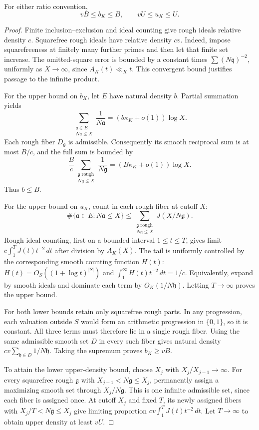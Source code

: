 \begin{lemma}\label{lem:BU}
For either ratio convention,
\[
                  vB\le b_K\le B,\qquad vU\le u_K\le U.
\]
\end{lemma}
\begin{proof}
Finite inclusion--exclusion and ideal counting give rough ideals
relative density $c$.  Squarefree rough ideals have relative density
$cv$.  Indeed, impose squarefreeness at finitely many further primes
and then let that finite set increase.  The omitted-square error is
bounded by a constant times $\sum(N\mathfrak q)^{-2}$, uniformly as
$X\to\infty$, since $A_K(t)\ll_K t$.  This convergent bound justifies
passage to the infinite product.

For the upper bound on $b_K$, let $E$ have natural density $b$.  Partial
summation yields
\[
 \sum_{\substack{\mathfrak a\in E\\N\mathfrak a\le X}}
       \frac1{N\mathfrak a}
   =(b\kappa_K+o(1))\log X.
\]
Each rough fiber $D_{\mathfrak g}$ is admissible.  Consequently its
smooth reciprocal sum is at most $B/c$, and the full sum is bounded by
\[
 \frac Bc\sum_{\substack{\mathfrak g\text{ rough}\\N\mathfrak g\le X}}
          \frac1{N\mathfrak g}
   =(B\kappa_K+o(1))\log X.
\]
Thus $b\le B$.

For the upper bound on $u_K$, count in each rough fiber at cutoff $X$:
\[
 \#\{\mathfrak a\in E:N\mathfrak a\le X\}
 \le \sum_{\substack{\mathfrak g\text{ rough}\\N\mathfrak g\le X}}
                  J(X/N\mathfrak g).
\]
Rough ideal counting, first on a bounded interval $1\le t\le T$, gives
limit $c\int_1^T J(t)t^{-2}\,dt$ after division by $A_K(X)$.
The tail is uniformly controlled by the corresponding smooth counting
function $H(t)$: $H(t)=O_S((1+\log t)^{|S|})$ and
$\int_1^\infty H(t)t^{-2}\,dt=1/c$.  Equivalently, expand by smooth
ideals and dominate each term by $O_K(1/N\mathfrak h)$.
Letting $T\to\infty$ proves the upper bound.

For both lower bounds retain only squarefree rough parts.  In any
progression, each valuation outside $S$ would form an arithmetic
progression in $\{0,1\}$, so it is constant.  All three terms must
therefore lie in a single rough fiber.  Using the same admissible
smooth set $D$ in every such fiber gives natural density
$cv\sum_{\mathfrak h\in D}1/N\mathfrak h$.  Taking the supremum
proves $b_K\ge vB$.

To attain the lower upper-density bound, choose $X_j$ with
$X_j/X_{j-1}\to\infty$.  For every squarefree rough $\mathfrak g$
with $X_{j-1}<N\mathfrak g\le X_j$, permanently assign a maximizing
smooth set through $X_j/N\mathfrak g$.  This is one infinite admissible
set, since each fiber is assigned once.  At cutoff $X_j$ and fixed
$T$, its newly assigned fibers with $X_j/T<N\mathfrak g\le X_j$
give limiting proportion $cv\int_1^T J(t)t^{-2}\,dt$.
Let $T\to\infty$ to obtain upper density at least $vU$.
\end{proof}

